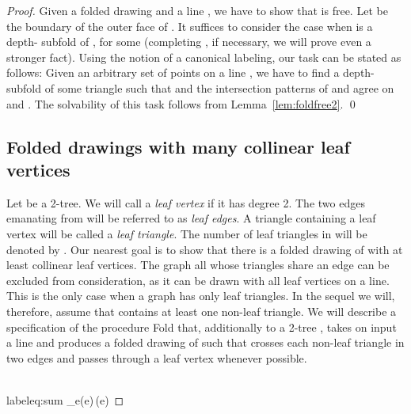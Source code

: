 \documentclass[reqno,12pt]{amsart}
\newcommand{\shift}{\mbox{}\hspace{4.5mm}}
\newcommand{\foldn}[1]{{\sc Fold}}
\newcommand{\fold}[2]{{\sc Fold}}
\newcommand{\cross}[1]{\mathrm{cr}(#1)}
\newenvironment{proofof}[1]{\par\smallbreak\noindent{\it Proof~of~#1.}}{\unskip\nobreak\hfill \qed \par\medbreak}
\begin{document}
\begin{proof}
\begin{proofof}{Lemma \ref{lem:foldfree}}
Given a folded drawing  and a line , we have to show that
 is free. Let  be the boundary of the outer face of .
It suffices to consider the case when  is a depth- subfold of ,
for some  (completing , if necessary, we will prove even a stronger fact).
Using the notion of a canonical labeling, our task can be stated as follows:
Given an arbitrary set  of  points on a line ,
we have to find a depth- subfold  of some triangle 
such that  and the intersection patterns of 
and  agree on  and .
The solvability of this task follows from Lemma~\ref{lem:foldfree2}.
\end{proofof}


\subsection{Folded drawings with many collinear leaf vertices}\label{ss:fold1}

Let  be a 2-tree. We will call  a \emph{leaf vertex} 
if it has degree 2. The two edges emanating from  will be referred to
as \emph{leaf edges}.
A triangle containing a leaf vertex will be called a \emph{leaf triangle}. 
The number of leaf triangles in  
will be denoted by . 
Our nearest goal is to show that there is a folded drawing of 
with at least  collinear leaf vertices.
The graph all whose triangles share an edge can be excluded from
consideration, as it can be drawn with all leaf vertices on a line.
This is the only case when a graph has only leaf triangles.
In the sequel we will, therefore, assume that  contains at least one non-leaf triangle.
We will describe a specification of the procedure \foldn{}
that, additionally to a 2-tree , takes on input a line 
and produces a folded drawing of  such that  crosses
each non-leaf triangle in two edges and passes through a leaf vertex
whenever possible.

\bigskip

\shift\fold1{G,\ell}\\label{eq:sum}
\sum_e\cross e\,\omega(e)


\end{proof}
\end{document}
